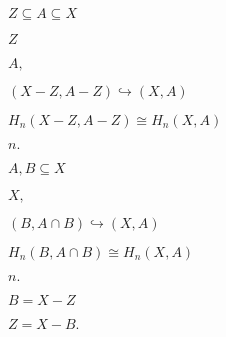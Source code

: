 \documentclass[10pt]{book}
\begin{document}
\begin{mdSnippets}
\begin{mdInlineSnippet}[84f5bfc192c0c627e1ae2e1b24bd4f01]
$Z \subseteq A \subseteq X$\end{mdInlineSnippet}%
\begin{mdInlineSnippet}[21c2e59531c8710156d34a3c30ac81d5]%
$Z$\end{mdInlineSnippet}%
\begin{mdInlineSnippet}[4675773653557201b63811ae89973c60]%
$A,$\end{mdInlineSnippet}%
\begin{mdInlineSnippet}%
$(X-Z, A-Z) \hookrightarrow (X,A)$\end{mdInlineSnippet}%
\begin{mdInlineSnippet}[ed0e21e94ece0e1b84c7fc6de9119b19]%
$H_n(X-Z, A-Z) \cong H_n(X,A)$\end{mdInlineSnippet}%
\begin{mdInlineSnippet}[36cb6ed5283e452800c275dd6934aecc]%
$n.$\end{mdInlineSnippet}%
\begin{mdInlineSnippet}%
$A,B \subseteq X$\end{mdInlineSnippet}%
\begin{mdInlineSnippet}[412bd1def2f1b61da9169d88e6c8b9e9]%
$X,$\end{mdInlineSnippet}%
\begin{mdInlineSnippet}%
$(B, A \cap B) \hookrightarrow (X,A)$\end{mdInlineSnippet}%
\begin{mdInlineSnippet}[21277b743200b59d2410cb5671dc31ae]%
$H_n(B, A \cap B) \cong H_n(X,A)$\end{mdInlineSnippet}%
\begin{mdInlineSnippet}[36cb6ed5283e452800c275dd6934aecc]%
$n.$\end{mdInlineSnippet}%
\begin{mdInlineSnippet}[7b8f2d143687d4489eef1c93de6c966c]%
$B = X - Z$\end{mdInlineSnippet}%
\begin{mdInlineSnippet}[56508e10b5c98b0c4f61026d74672000]%
$Z = X - B.$\end{mdInlineSnippet}%
\begin{mdInlineSnippet}[edc5fb26bb39ae8bd95fe26fc5c07299]%

\end{mdInlineSnippet}
\end{mdSnippets}
\end{document}

